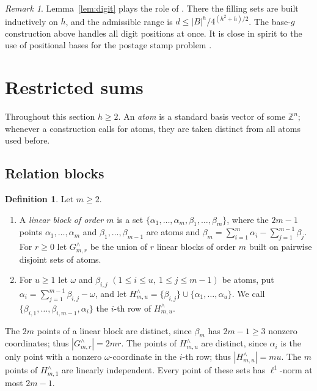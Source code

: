 \documentclass[11pt]{amsart}
\theoremstyle{definition}
\newtheorem{definition}[theorem]{Definition}
\theoremstyle{remark}
\newtheorem{remark}[theorem]{Remark}
\numberwithin{equation}{section}
\newcommand{\Z}{\mathbb{Z}}
\begin{document}
\begin{remark}
Lemma~\ref{lem:digit} plays the role of \cite[Lemma~4.4]{Raj26}. There the filling sets are built inductively on $h$, and the admissible range is $d\le|B|^h/4^{(h^2+h)/2}$. The base-$g$ construction above handles all digit positions at once. It is close in spirit to the use of positional bases for the postage stamp problem \cite{Tri08}.
\end{remark}

\section{Restricted sums}\label{sec:restricted}

Throughout this section $h\ge 2$. An \emph{atom} is a standard basis vector of some $\Z^n$; whenever a construction calls for atoms, they are taken distinct from all atoms used before.

\subsection{Relation blocks}\label{sec:restricted-blocks}

\begin{definition}
Let $m\ge 2$.
\begin{enumerate}[label=\textup{(\roman*)}]
\item A \emph{linear block of order $m$} is a set $\{\alpha_1,\dots,\alpha_m,\beta_1,\dots,\beta_m\}$, where the $2m-1$ points $\alpha_1,\dots,\alpha_m$ and $\beta_1,\dots,\beta_{m-1}$ are atoms and $\beta_m=\sum_{i=1}^m\alpha_i-\sum_{j=1}^{m-1}\beta_j$. For $r\ge 0$ let $G^\wedge_{m,r}$ be the union of $r$ linear blocks of order $m$ built on pairwise disjoint sets of atoms.
\item For $u\ge 1$ let $\omega$ and $\beta_{i,j}$ $(1\le i\le u,\ 1\le j\le m-1)$ be atoms, put $\alpha_i=\sum_{j=1}^{m-1}\beta_{i,j}-\omega$, and let $H^\wedge_{m,u}=\{\beta_{i,j}\}\cup\{\alpha_1,\dots,\alpha_u\}$. We call $\{\beta_{i,1},\dots,\beta_{i,m-1},\alpha_i\}$ the $i$-th row of $H^\wedge_{m,u}$.
\end{enumerate}
\end{definition}

The $2m$ points of a linear block are distinct, since $\beta_m$ has $2m-1\ge 3$ nonzero coordinates; thus $|G^\wedge_{m,r}|=2mr$. The points of $H^\wedge_{m,u}$ are distinct, since $\alpha_i$ is the only point with a nonzero $\omega$-coordinate in the $i$-th row; thus $|H^\wedge_{m,u}|=mu$. The $m$ points of $H^\wedge_{m,1}$ are linearly independent. Every point of these sets has $\ell^1$-norm at most $2m-1$.
\end{document}
